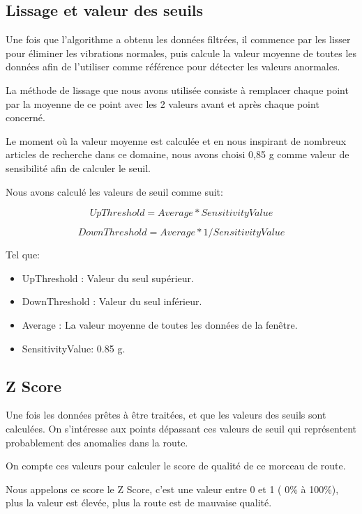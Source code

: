 \subsection{Lissage et valeur des seuils}
Une fois que l’algorithme a obtenu les données filtrées, il commence par les lisser pour éliminer les vibrations normales, puis calcule la valeur moyenne de toutes les données afin de l’utiliser comme référence pour détecter les valeurs anormales.

La méthode de lissage que nous avons utilisée consiste à remplacer chaque point par la moyenne de ce point avec les 2 valeurs avant et après chaque point concerné. 

Le moment où la valeur moyenne est calculée  et en nous inspirant de nombreux articles de recherche dans ce domaine, nous avons choisi 0,85 g comme valeur de sensibilité afin de calculer le seuil.

Nous avons calculé les valeurs de seuil comme suit:

\[UpThreshold = Average   * SensitivityValue\]

\[DownThreshold =  Average  * 1/SensitivityValue\]

  Tel que:
  
\begin{itemize}
  \item UpThreshold : Valeur du seul supérieur.
  \item DownThreshold : Valeur du seul inférieur.
  \item Average : La valeur moyenne de toutes les données de la fenêtre.
  \item  SensitivityValue: 0.85 g.
\end{itemize}


\subsection{Z Score}
Une fois les données prêtes à être traitées, et que les valeurs des seuils sont calculées. On s’intéresse aux points dépassant ces valeurs de seuil qui représentent probablement des anomalies dans la route.

On compte ces valeurs pour calculer le score de qualité de ce morceau  de route.

Nous appelons ce score le Z Score, c'est une valeur entre 0 et 1 ( 0\% à 100\%), plus la valeur est élevée, plus la route est de mauvaise qualité.
